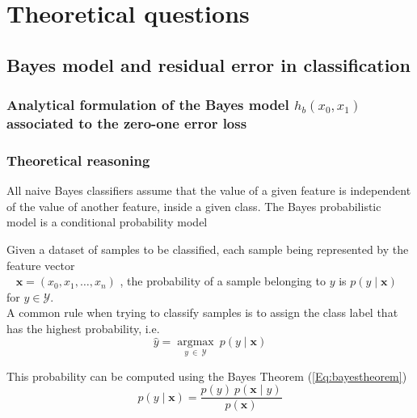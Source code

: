 \documentclass{article}
\begin{document}
\section{Theoretical questions}
\subsection{Bayes model and residual error in classification}
\subsubsection{Analytical formulation of the Bayes model \textit{$h_b(x_0,x_1)$} associated to the zero-one error
loss}

\subsubsection*{Theoretical reasoning}
All naive Bayes classifiers assume that the value of a given feature is independent of the value of another feature, inside a given class.
The Bayes probabilistic model is a conditional probability model

Given a dataset of samples to be classified, each sample being represented by the feature vector \\
~
\begin{math}
\boldsymbol{x} = (x_0, x_1, \dots, x_n)
\end{math}
, the probability of a sample belonging to $y$ is 
\begin{math}
 p(y \mid \boldsymbol{x})
\end{math}
for $y \in \mathcal{Y}$. \\
A common rule when trying to classify samples is to assign the class label that has the highest probability, i.e.
\begin{equation*}
    \hat {y}={\underset {y\ \in\  \mathcal{Y}}{\operatorname {argmax} }}\ p(y \mid \boldsymbol{x})
    \label{Eq:commonclassifier}
\end{equation*}


\noindent This probability can be computed using the Bayes Theorem (\ref{Eq:bayestheorem})
\begin{equation}
 p(y \mid \boldsymbol{x}) = \frac {p(y)\ p(\boldsymbol{x} \mid y)}{p(\boldsymbol{x}) }
\label{Eq:bayestheorem}
\end{equation}

\end{document}
